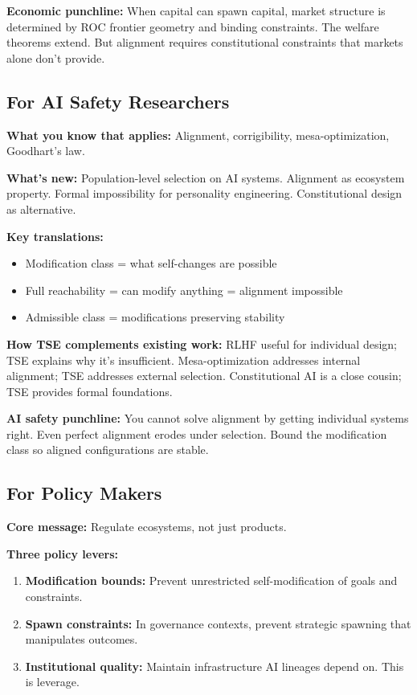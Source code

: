 \documentclass[12pt]{article}
\begin{document}
\textbf{Economic punchline:} When capital can spawn capital, market structure is determined by ROC frontier geometry and binding constraints. The welfare theorems extend. But alignment requires constitutional constraints that markets alone don't provide.

\subsection{For AI Safety Researchers}

\textbf{What you know that applies:} Alignment, corrigibility, mesa-optimization, Goodhart's law.

\textbf{What's new:} Population-level selection on AI systems. Alignment as ecosystem property. Formal impossibility for personality engineering. Constitutional design as alternative.

\textbf{Key translations:}
\begin{itemize}[nosep]
\item Modification class = what self-changes are possible
\item Full reachability = can modify anything = alignment impossible
\item Admissible class = modifications preserving stability
\end{itemize}

\textbf{How TSE complements existing work:} RLHF useful for individual design; TSE explains why it's insufficient. Mesa-optimization addresses internal alignment; TSE addresses external selection. Constitutional AI is a close cousin; TSE provides formal foundations.

\textbf{AI safety punchline:} You cannot solve alignment by getting individual systems right. Even perfect alignment erodes under selection. Bound the modification class so aligned configurations are stable.

\subsection{For Policy Makers}

\textbf{Core message:} Regulate ecosystems, not just products.

\textbf{Three policy levers:}
\begin{enumerate}[nosep]
\item \textbf{Modification bounds:} Prevent unrestricted self-modification of goals and constraints.
\item \textbf{Spawn constraints:} In governance contexts, prevent strategic spawning that manipulates outcomes.
\item \textbf{Institutional quality:} Maintain infrastructure AI lineages depend on. This is leverage.
\end{enumerate}
\end{document}
